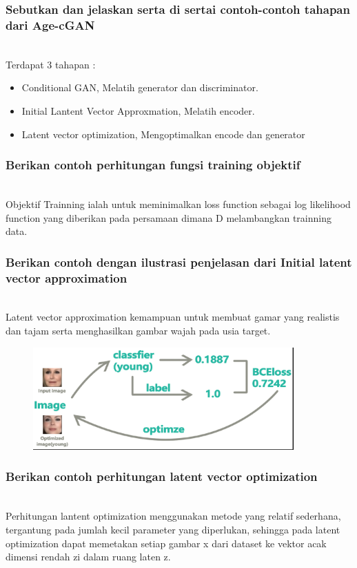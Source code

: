 	\subsubsection{Sebutkan dan jelaskan serta di sertai contoh-contoh tahapan dari Age-cGAN}
	\hfill\\
	Terdapat 3 tahapan : 
	\begin{itemize}
		\item Conditional GAN, Melatih generator dan discriminator.
		\item Initial Lantent Vector Approxmation, Melatih encoder.
		\item Latent vector optimization, Mengoptimalkan encode dan generator
	\end{itemize}

	\subsubsection{Berikan contoh perhitungan fungsi training objektif}
	\hfill\\
	Objektif Trainning ialah untuk meminimalkan loss function sebagai log likelihood function yang diberikan pada persamaan dimana D melambangkan trainning data.
	
	\subsubsection{Berikan contoh dengan ilustrasi penjelasan dari Initial latent vector approximation}
	\hfill\\
	Latent vector approximation kemampuan untuk membuat gamar yang realistis dan tajam serta menghasilkan gambar wajah pada usia target.
	
	\begin{figure}[H]
		\begin{center}
		 \includegraphics[width=10cm]{figures/1174076/figures9/teori10.png}
		 \caption{}	
		\end{center}
	\end{figure}

	\subsubsection{Berikan contoh perhitungan latent vector optimization}
	\hfill\\
	Perhitungan lantent optimization menggunakan metode yang relatif sederhana, tergantung pada jumlah kecil parameter yang diperlukan, sehingga pada latent optimization dapat memetakan setiap gambar x dari dataset ke vektor acak dimensi rendah zi dalam ruang laten z.
	
